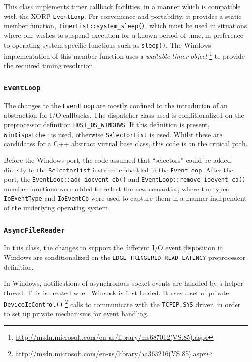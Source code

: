 \documentclass[11pt]{article}
\begin{document}
This class implements timer callback facilities, in a manner which is compatible with
the XORP {\tt EventLoop}.
For convenience and portability, it provides a static member function,
{\tt TimerList::system\_sleep()},
which must be used in situations where one wishes to suspend execution for a known
period of time, in preference to operating system specific functions
such as {\tt sleep()}.
The Windows implementation of this member function uses a
{\em waitable timer object}
\footnote{\url{http://msdn.microsoft.com/en-us/library/ms687012(VS.85).aspx}}
to provide the required timing resolution.

\subsubsection{{\tt EventLoop}}

The changes to the
{\tt EventLoop}
are mostly confined to the introducion of an abstraction
for I/O callbacks.
The dispatcher class used is conditionalized
on the preprocessor definition
{\tt HOST\_OS\_WINDOWS}.
If this definition is present,
{\tt WinDispatcher} is used, otherwise
{\tt SelectorList} is used.
Whilst these are candidates for a C++ abstract virtual base class,
this code is on the critical path.

Before the Windows port,
the code assumed that ``selectors'' could be added directly to the
{\tt SelectorList}
instance embedded in the
{\tt EventLoop}.
After the port, the
{\tt EventLoop::add\_ioevent\_cb()}
and
{\tt EventLoop::remove\_ioevent\_cb()}
member functions were added to reflect the new semantics,
where the types
{\tt IoEventType}
and
{\tt IoEventCb}
were used to capture them in a manner independent of the
underlying operating system.

\subsubsection{{\tt AsyncFileReader}}

In this class, the changes to support the different I/O event disposition in
Windows are conditionalized on the
{\tt EDGE\_TRIGGERED\_READ\_LATENCY}
preprocessor definition.

In Windows, notifications of asynchronous socket events are handled by a
helper thread. This is created when Winsock is first loaded. It uses a set of
private {\tt DeviceIoControl()}
\footnote{\url{http://msdn.microsoft.com/en-us/library/aa363216(VS.85).aspx}}
calls to communicate with the {\tt TCPIP.SYS} driver, in order to set up private
mechanisms for event handling.
\end{document}
